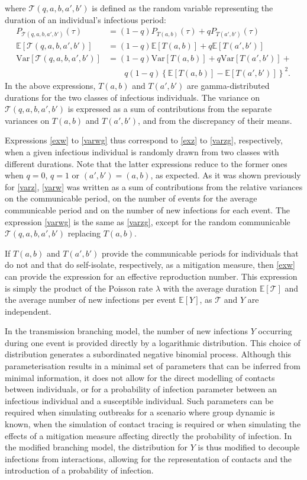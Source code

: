 \documentclass[sr]{drdc-report}
\newcommand{\Tau}{\mathcal{T}}
\newcommand{\ex}[1]{\mathbb{E}\left[#1\right]}
\newcommand{\var}[1]{\mathrm{Var}\left[#1\right]}
\begin{document}
where $\Tau(q,a,b,a',b')$ is defined as the random variable representing the duration of an individual's infectious period:
\begin{align}
P_{\Tau(q,a,b,a',b')}(\tau) & =(1-q)P_{T(a,b)}(\tau)+qP_{T(a',b')}(\tau)\\
\ex{\Tau(q,a,b,a',b')} & = (1-q)\ex{T(a,b)}+q\ex{T(a',b')}\\
\var{\Tau(q,a,b,a',b')} & = (1-q)\var{T(a,b)}+q\var{T(a',b')}+\nonumber\\
& \qquad q(1-q)\left\{\ex{T(a,b)}-\ex{T(a',b')}\right\}^2.
\end{align}
In the above expressions, $T(a,b)$ and $T(a',b')$ are gamma-distributed durations for the two classes of infectious individuals.
The variance on $\Tau(q,a,b,a',b')$ is expressed as a sum of contributions from the separate variances on $T(a,b)$ and $T(a',b')$, and from the discrepancy of their means.

Expressions \eqref{exw} to \eqref{varwg} thus correspond to \eqref{exz} to \eqref{varzg}, respectively, when a given infectious individual is randomly drawn from two classes with different durations.
Note that the latter expressions reduce to the former ones when $q=0$, $q=1$ or $(a',b')=(a,b)$, as expected.
As it was shown previously for \eqref{varz}, \eqref{varw} was written as a sum of contributions from the relative variances on the communicable period, on the number of events for the average communicable period and on the number of new infections for each event.
The expression \eqref{varwg} is the same as \eqref{varzg}, except for the random communicable $\Tau(q,a,b,a',b')$ replacing $T(a,b)$.

If $T(a,b)$ and $T(a',b')$ provide the communicable periods for individuals that do not and that do self-isolate, respectively, as a mitigation measure, then \eqref{exw} can provide the expression for an effective reproduction number.
This expression is simply the product of the Poisson rate $\lambda$ with the average duration $\ex{\Tau}$ and the average number of new infections per event $\ex{Y}$, as $\Tau$ and $Y$ are independent.

In the transmission branching model, the number of new infections $Y$ occurring during one event is provided directly by a logarithmic distribution.
This choice of distribution generates a subordinated negative binomial process.
Although this parameterisation results in a minimal set of parameters that can be inferred from minimal information, it does not allow for the direct modelling of contacts between individuals, or for a probability of infection parameter between an infectious individual and a susceptible individual.
Such parameters can be required when simulating outbreaks for a scenario where group dynamic is known, when the simulation of contact tracing is required or when simulating the effects of a mitigation measure affecting directly the probability of infection.
In the modified branching model, the distribution for $Y$ is thus modified to decouple infections from interactions, allowing for the representation of contacts and the introduction of a probability of infection.
\end{document}
